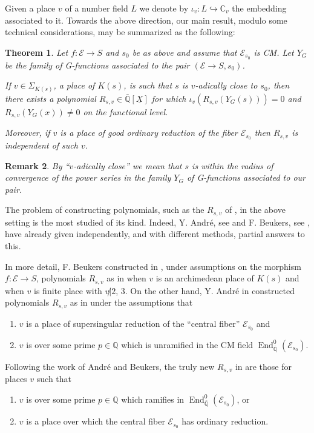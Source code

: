\documentclass[12pt,twoside,a4paper]{article}
\theoremstyle{plain}%
\newtheorem{theorem}{Theorem}[section] %
\newtheorem{remark}[theorem]{Remark}
\DeclareMathOperator{\End}{End}
\newcommand{\C}{\mathbb{C}}
\newcommand{\Q}{\mathbb{Q}}
\newcommand{\CE}{\mathcal{E}}
\begin{document}
Given a place $v$ of a number field $L$ we denote by $\iota_v:L\hookrightarrow \C_v$ the embedding associated to it. Towards the above direction, our main result, modulo some technical considerations, may be summarized as the following:
\begin{theorem}\label{naiverelations}
	Let $f:\CE\rightarrow S$ and $s_0$ be as above and assume that $\CE_{s_0}$ is CM. Let $Y_G$ be the family of G-functions associated to the pair $(\CE\rightarrow S,s_0)$. 
	
	If $v\in \Sigma_{K(s)}$, a place of $K(s)$, is such that $s$ is $v$-adically close to $s_0$, then there exists a polynomial $R_{s,v}\in\bar{\Q}[\underline{X}]$ for which $\iota_v(R_{s,v}(Y_G(s)))=0$ and $R_{s,v}(Y_G(x))\neq0$ on the functional level. 
	
	Moreover, if $v$ is a place of good ordinary reduction of the fiber $\CE_{s_0}$ then $R_{s,v}$ is independent of such $v$.
\end{theorem}
\begin{remark} By ``$v$-adically close'' we mean that $s$ is within the radius of convergence of the power series in the family $Y_G$ of G-functions associated to our pair. 
	
\end{remark}

The problem of constructing polynomials, such as the $R_{s,v}$ of , in the above setting is the most studied of its kind. Indeed, Y. Andr\'e, see \cite{andremots} and F. Beukers, see \cite{beukers}, have already given independently, and with different methods, partial answers to this. 

In more detail, F. Beukers constructed in \cite{beukers}, under assumptions on the morphism $f:\CE \rightarrow S$, polynomials $R_{s,v}$ as in  when $v$ is an archimedean place of $K(s)$ and when $v$ is finite place with $\displaystyle{v\not|2}$, $3$. On the other hand, Y. Andr\'e in \cite{andremots} constructed polynomials $R_{s,v}$ as in  under the assumptions that 
\begin{enumerate}
\item $v$ is a place of supersingular reduction of the ``central fiber'' $\CE_{s_0}$ and 
\item $v$ is over some prime $p\in \Q$ which is unramified in the CM field $\End^{0}_{\bar{\Q}}(\CE_{s_0})$.
\end{enumerate}

Following the work of Andr\'e and Beukers, the truly new $R_{s,v}$ in  are those for places $v$ such that 
\begin{enumerate}
	\item $v$ is over some prime $p\in \Q$ which ramifies in $\End^{0}_{\bar{\Q}}(\CE_{s_0})$, or 
	\item $v$ is a place over which the central fiber $\CE_{s_0}$ has ordinary reduction.
\end{enumerate}
\end{document}
